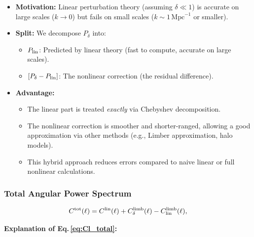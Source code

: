 \begin{itemize}[leftmargin=1.5cm]
    \item \textbf{Motivation:} Linear perturbation theory (assuming $\delta \ll 1$) is accurate on large scales ($k \to 0$) but fails on small scales ($k \sim 1\, \text{Mpc}^{-1}$ or smaller).
    
    \item \textbf{Split:} We decompose $P_\delta$ into:
    \begin{itemize}
        \item $P_{\rm lin}$: Predicted by linear theory (fast to compute, accurate on large scales).
        \item $[P_\delta - P_{\rm lin}]$: The nonlinear correction (the residual difference).
    \end{itemize}

    \item \textbf{Advantage:}
    \begin{itemize}
        \item The linear part is treated \emph{exactly} via Chebyshev decomposition.
        \item The nonlinear correction is smoother and shorter-ranged, allowing a good approximation via other methods (e.g., Limber approximation, halo models).
        \item This hybrid approach reduces errors compared to naive linear or full nonlinear calculations.
    \end{itemize}
\end{itemize}

\subsubsection{Total Angular Power Spectrum}

\begin{equation}
    C^{\rm tot}(\ell) = C^{\rm lin}(\ell)
    + C^{\rm limb}_\delta(\ell) - C^{\rm limb}_{\rm lin}(\ell),
    \label{eq:Cl_total}
\end{equation}

\noindent\textbf{\large Explanation of Eq.\,\eqref{eq:Cl_total}:}\\

